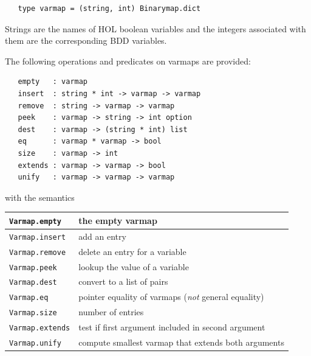 \documentclass[12pt,fleqn]{article}
\renewcommand{\t}[1]{\mbox{\tt #1}}
\begin{document}
\begin{verbatim}
   type varmap = (string, int) Binarymap.dict
\end{verbatim}

\vspace*{-2mm}

Strings are the names of HOL boolean variables and the integers associated with them
are the corresponding BDD variables.

The following operations and predicates on varmaps are provided:

\begin{verbatim}
   empty   : varmap
   insert  : string * int -> varmap -> varmap
   remove  : string -> varmap -> varmap
   peek    : varmap -> string -> int option
   dest    : varmap -> (string * int) list
   eq      : varmap * varmap -> bool
   size    : varmap -> int
   extends : varmap -> varmap -> bool
   unify   : varmap -> varmap -> varmap
\end{verbatim}

with the semantics

\bigskip

\begin{tabular}{|l|l|} \hline
\t{Varmap.empty} &    the empty varmap \\ \hline
\t{Varmap.insert} &   add an entry \\ \hline
\t{Varmap.remove} &   delete an entry for a variable \\ \hline
\t{Varmap.peek} &     lookup the value of a variable \\ \hline
\t{Varmap.dest} &     convert to a list of pairs \\ \hline
\t{Varmap.eq} &       pointer equality of varmaps ({\it not} general equality) \\ \hline
\t{Varmap.size} &     number of entries \\ \hline
\t{Varmap.extends} &  test if first argument included in second argument\\ \hline
\t{Varmap.unify} &  compute smallest varmap that extends both arguments\\ \hline
\end{tabular}
\end{document}
